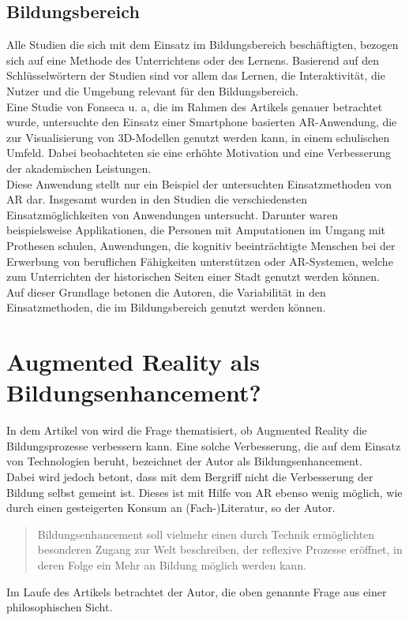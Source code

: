 \subsection{Bildungsbereich}
Alle Studien die sich mit dem Einsatz im Bildungsbereich beschäftigten, bezogen sich auf eine Methode des Unterrichtens oder des Lernens. Basierend auf den Schlüsselwörtern der Studien sind vor allem das Lernen, die Interaktivität, die Nutzer und die Umgebung relevant für den Bildungsbereich.\\
Eine Studie von Fonseca u. a, die im Rahmen des Artikels genauer betrachtet wurde, untersuchte den Einsatz einer Smartphone basierten AR-Anwendung, die zur Visualisierung von 3D-Modellen genutzt werden kann, in einem schulischen Umfeld. Dabei beobachteten sie eine erhöhte Motivation und eine Verbesserung der akademischen Leistungen. \\
Diese Anwendung stellt nur ein Beispiel der untersuchten Einsatzmethoden von AR dar. Insgesamt wurden in den Studien die verschiedensten Einsatzmöglichkeiten von Anwendungen untersucht. Darunter waren beispielsweise Applikationen, die Personen mit Amputationen im Umgang mit Prothesen schulen, Anwendungen, die kognitiv beeinträchtigte Menschen bei der Erwerbung von beruflichen Fähigkeiten unterstützen oder AR-Systemen, welche zum Unterrichten der historischen Seiten einer Stadt genutzt werden können. \\
Auf dieser Grundlage betonen die Autoren, die Variabilität in den Einsatzmethoden, die im Bildungsbereich genutzt werden können. \citep[Kapitel 4.2]{dey:review-of-ar-studies}


\section{Augmented Reality als Bildungsenhancement?}
In dem Artikel \citep{damberger:ar-bildungsenhancement} von \citeauthor{damberger:ar-bildungsenhancement} wird die Frage thematisiert, ob Augmented Reality die Bildungsprozesse verbessern kann. Eine solche Verbesserung, die auf dem Einsatz von Technologien beruht, bezeichnet der Autor als Bildungsenhancement. \\
Dabei wird jedoch betont, dass mit dem Bergriff nicht die Verbesserung der Bildung selbst gemeint ist. Dieses ist mit Hilfe von AR ebenso wenig möglich, wie durch einen gesteigerten Konsum an (Fach-)Literatur, so der Autor.
\begin{quote}
\glqq Bildungsenhancement soll vielmehr einen durch Technik ermöglichten besonderen Zugang zur Welt beschreiben, der reflexive Prozesse eröffnet, in deren Folge ein Mehr an Bildung möglich werden kann.\grqq \citep[S. 5]{damberger:ar-bildungsenhancement}
\end{quote}
Im Laufe des Artikels betrachtet der Autor, die oben genannte Frage aus einer philosophischen Sicht.

